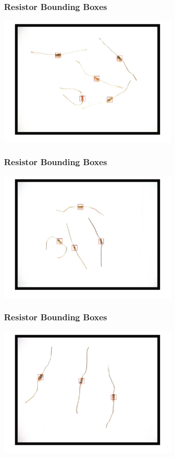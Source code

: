 \documentclass{beamer}
\begin{document}
\begin{frame}
\frametitle{Resistor Bounding Boxes}
\begin{center}
\includegraphics[width=3.5in]{images/example7/bbs.jpg}
\end{center}
\end{frame}

\begin{frame}
\frametitle{Resistor Bounding Boxes}
\begin{center}
\includegraphics[width=3.5in]{images/example8/bbs.jpg}
\end{center}
\end{frame}

\begin{frame}
\frametitle{Resistor Bounding Boxes}
\begin{center}
\includegraphics[width=3.5in]{images/example9/bbs.jpg}
\end{center}
\end{frame}
\end{document}
